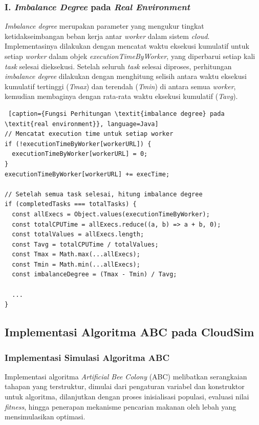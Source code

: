 \subsubsection{I. \textit{Imbalance Degree} pada \textit{Real Environment}}
\textit{Imbalance degree} merupakan parameter yang mengukur tingkat ketidakseimbangan beban kerja antar \textit{worker} dalam sistem \textit{cloud}. Implementasinya dilakukan dengan mencatat waktu eksekusi kumulatif untuk setiap \textit{worker} dalam objek \textit{executionTimeByWorker}, yang diperbarui setiap kali \textit{task} selesai dieksekusi. Setelah seluruh \textit{task} selesai diproses, perhitungan \textit{imbalance degree} dilakukan dengan menghitung selisih antara waktu eksekusi kumulatif tertinggi (\textit{Tmax}) dan terendah (\textit{Tmin}) di antara semua \textit{worker}, kemudian membaginya dengan rata-rata waktu eksekusi kumulatif (\textit{Tavg}).

\begin{lstlisting} [caption={Fungsi Perhitungan \textit{imbalance degree} pada \textit{real environment}}, language=Java]
// Mencatat execution time untuk setiap worker
if (!executionTimeByWorker[workerURL]) {
  executionTimeByWorker[workerURL] = 0;
}
executionTimeByWorker[workerURL] += execTime;

// Setelah semua task selesai, hitung imbalance degree
if (completedTasks === totalTasks) {
  const allExecs = Object.values(executionTimeByWorker);
  const totalCPUTime = allExecs.reduce((a, b) => a + b, 0);
  const totalValues = allExecs.length;
  const Tavg = totalCPUTime / totalValues;
  const Tmax = Math.max(...allExecs);
  const Tmin = Math.min(...allExecs);
  const imbalanceDegree = (Tmax - Tmin) / Tavg;
  
  ...
}
\end{lstlisting}

\subsection{Implementasi Algoritma ABC pada CloudSim}
\subsubsection{Implementasi Simulasi Algoritma ABC}
Implementasi algoritma \textit{Artificial Bee Colony} (ABC) melibatkan serangkaian tahapan yang terstruktur, dimulai dari pengaturan variabel dan konstruktor untuk algoritma, dilanjutkan dengan proses inisialisasi populasi, evaluasi nilai \textit{fitness}, hingga penerapan mekanisme pencarian makanan oleh lebah yang mensimulasikan optimasi.

